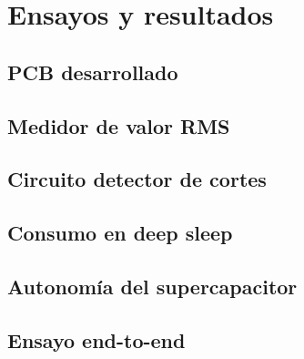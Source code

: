 
\chapter{Ensayos y resultados} %

\label{Chapter4} %


\section{PCB desarrollado}
\label{sec:pruebasHW}

\section{Medidor de valor RMS}\label{ensayo_medidor_rms}

\section{Circuito detector de cortes}

\section{Consumo en deep sleep}

\section{Autonom\'{i}a del supercapacitor}

\section{Ensayo end-to-end}